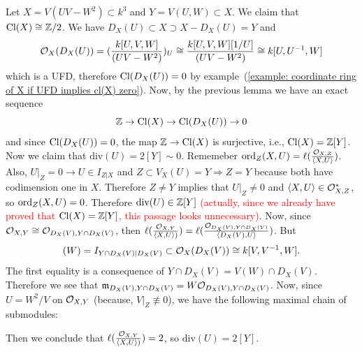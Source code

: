 \begin{example}
    Let $X=V(UV-W^2)\subset k^3$ and $Y=V(U,W)\subset X$. We claim that $\text{Cl}(X)\cong\mathbb{Z}/2$. We 
    have $D_X(U)\subset X\supset X-D_X(U)= Y$ and 
    \begin{equation}
        \mathcal{O}_X(D_X(U)) = (\frac{k[U,V,W]}{(UV-W^2)})_U \cong \frac{k[U,V,W][1/U]}{(UV-W^2)}\cong k[U,U^{-1},W]
    \end{equation}
    which is a UFD, therefore $\text{Cl}(D_X(U)) = 0$ by example~(\ref{example: coordinate ring of X if UFD implies cl(X) zero}). 
    Now, by the previous lemma we have an exact sequence 
    \begin{equation}
        \mathbb{Z}\to \text{Cl}(X)\to \text{Cl}(D_X(U))\to 0
    \end{equation}
    and since $\text{Cl}(D_X(U))=0$, the map $\mathbb{Z}\to \text{Cl}(X)$ is surjective, i.e., $\text{Cl}(X)=\mathbb{Z}[Y]$. 
    Now we claim that $\text{div}(U) =2[Y]\sim 0$. Rememeber $\text{ord}_Z(X,U)=\ell(\tfrac{\mathcal{O}_{X,Z}}{\langle X,U\rangle})$. 
    Also, $U|_{Z}=0\rightarrow U\in I_{Z|X}$ and $Z\subset V_X(U)= Y\Rightarrow Z=Y$ because both have 
    codimension one in $X$. Therefore $Z\neq Y$ implies that $U|_Z\neq 0$ and 
    $\langle X,U\rangle\in\mathcal{O}_{X,Z}^*$, so $\text{ord}_Z(X,U)=0$. Therefore $\text{div}(U)\in\mathbb{Z}[Y]$ \textcolor{red}{(actually, 
    since we already have proved that $\text{Cl}(X) = \mathbb{Z}[Y]$, this passage looks unnecessary)}. Now, since 
    $\mathcal{O}_{X,Y}\cong\mathcal{O}_{D_X(V),Y\cap D_X(V)}$, then 
    $\ell(\tfrac{\mathcal{O}_{X,Y}}{\langle X,U\rangle)})=\ell(\tfrac{\mathcal{O}_{D_X(V),Y\cap D_X(V)}}{\langle D_X(V),U\rangle})$. But 
    \begin{equation}
        (W) = I_{Y\cap D_X(V)|D_X(V)} \subset \mathcal{O}_X(D_X(V)) \cong k[V,V^{-1},W].
    \end{equation}
    The first equality is a consequence of $Y\cap D_X(V) = V(W)\cap D_X(V)$. Therefore 
    we see that $\mathfrak{m}_{D_X(V),Y\cap D_X(V)} = W\mathcal{O}_{D_X(V),Y\cap D_X(V)}$.
    Now, since $U = W^2/ V$ on $\mathcal{O}_{X,Y}$ (because, $V|_{Z}\not\equiv0$), we have 
    the following maximal chain of submodules:
    \begin{center}
    \end{center}
    Then we conclude that $\ell(\tfrac{\mathcal{O}_{X,Y}}{\langle X,U\rangle)})=2$, so $\text{div}(U)=2[Y]$.
\end{example}

